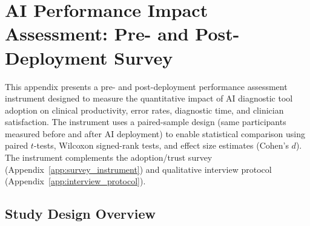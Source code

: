 
\section{AI Performance Impact Assessment: Pre- and Post-Deployment Survey}
\label{app:performance_impact}

This appendix presents a pre- and post-deployment performance assessment instrument designed to measure the quantitative impact of AI diagnostic tool adoption on clinical productivity, error rates, diagnostic time, and clinician satisfaction. The instrument uses a paired-sample design (same participants measured before and after AI deployment) to enable statistical comparison using paired $t$-tests, Wilcoxon signed-rank tests, and effect size estimates (Cohen's $d$). The instrument complements the adoption/trust survey (Appendix~\ref{app:survey_instrument}) and qualitative interview protocol (Appendix~\ref{app:interview_protocol}).

\subsection{Study Design Overview}

